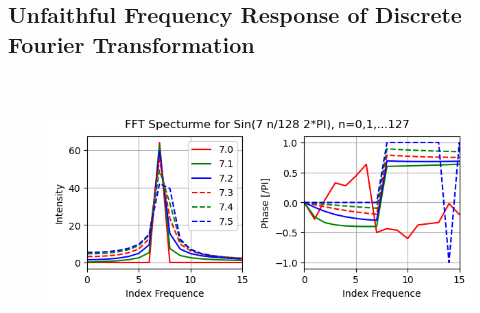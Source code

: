\documentclass[twoside]{article}
\numberwithin{equation}{section}
\newcommand{\eqspace}{\;\;\;}
\begin{document}
\subsection{Unfaithful Frequency Response of Discrete Fourier Transformation \cite{Prev_Precision_Arithmetic}}

\begin{figure}%
\includegraphics[width=4.5in,height=2.75in]{FFT_Unfaithful.png} 
\label{fig: FFT_Unfaithful}
\end{figure}
\end{document}
